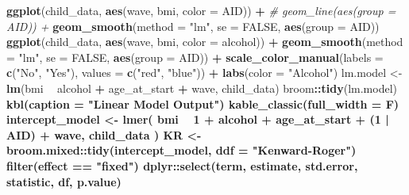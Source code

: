 \documentclass[12pt, twoside]{amherstthesis}
\newenvironment{Shaded}{\begin{snugshade}}{\end{snugshade}}
\newcommand{\CommentTok}[1]{\textcolor[rgb]{0.56,0.35,0.01}{\textit{#1}}}
\newcommand{\DataTypeTok}[1]{\textcolor[rgb]{0.13,0.29,0.53}{#1}}
\newcommand{\DecValTok}[1]{\textcolor[rgb]{0.00,0.00,0.81}{#1}}
\newcommand{\KeywordTok}[1]{\textcolor[rgb]{0.13,0.29,0.53}{\textbf{#1}}}
\newcommand{\NormalTok}[1]{#1}
\newcommand{\OperatorTok}[1]{\textcolor[rgb]{0.81,0.36,0.00}{\textbf{#1}}}
\newcommand{\OtherTok}[1]{\textcolor[rgb]{0.56,0.35,0.01}{#1}}
\newcommand{\StringTok}[1]{\textcolor[rgb]{0.31,0.60,0.02}{#1}}
\begin{document}
\begin{Shaded}
\begin{Highlighting}[]
{{{{{{{{{{{{{{{{{{{{{{{{{{{{{{{{{{{{{{{{{{{{{{{{{{{{{{{{{{{{{{{{{{{{\KeywordTok{ggplot}\NormalTok{(child_data, }\KeywordTok{aes}\NormalTok{(wave, bmi, }\DataTypeTok{color =}\NormalTok{ AID)) }\OperatorTok{+}
\StringTok{  }\CommentTok{# geom_line(aes(group = AID))  +}
\StringTok{  }\KeywordTok{geom_smooth}\NormalTok{(}\DataTypeTok{method =} \StringTok{"lm"}\NormalTok{, }\DataTypeTok{se =} \OtherTok{FALSE}\NormalTok{, }\KeywordTok{aes}\NormalTok{(}\DataTypeTok{group =}\NormalTok{ AID))}
\KeywordTok{ggplot}\NormalTok{(child_data, }\KeywordTok{aes}\NormalTok{(wave, bmi, }\DataTypeTok{color =}\NormalTok{ alcohol)) }\OperatorTok{+}
\StringTok{  }\KeywordTok{geom_smooth}\NormalTok{(}\DataTypeTok{method =} \StringTok{"lm"}\NormalTok{, }\DataTypeTok{se =} \OtherTok{FALSE}\NormalTok{, }\KeywordTok{aes}\NormalTok{(}\DataTypeTok{group =}\NormalTok{ AID)) }\OperatorTok{+}
\StringTok{  }\KeywordTok{scale_color_manual}\NormalTok{(}\DataTypeTok{labels =} \KeywordTok{c}\NormalTok{(}\StringTok{"No"}\NormalTok{, }\StringTok{"Yes"}\NormalTok{), }\DataTypeTok{values =} \KeywordTok{c}\NormalTok{(}\StringTok{"red"}\NormalTok{, }\StringTok{"blue"}\NormalTok{)) }\OperatorTok{+}
\StringTok{  }\KeywordTok{labs}\NormalTok{(}\DataTypeTok{color =} \StringTok{"Alcohol"}\NormalTok{)}
\NormalTok{lm.model <-}\StringTok{ }\KeywordTok{lm}\NormalTok{(bmi }\OperatorTok{~}\StringTok{ }\NormalTok{alcohol }\OperatorTok{+}\StringTok{ }\NormalTok{age_at_start }\OperatorTok{+}\StringTok{ }\NormalTok{wave, child_data)}
\NormalTok{broom}\OperatorTok{::}\KeywordTok{tidy}\NormalTok{(lm.model) }\OperatorTok{%>%}
\StringTok{  }\KeywordTok{kbl}\NormalTok{(}\DataTypeTok{caption =} \StringTok{"Linear Model Output"}\NormalTok{) }\OperatorTok{%>%}
\StringTok{  }\KeywordTok{kable_classic}\NormalTok{(}\DataTypeTok{full_width =}\NormalTok{ F)}
\NormalTok{intercept_model <-}\StringTok{ }\KeywordTok{lmer}\NormalTok{(}
\NormalTok{  bmi }\OperatorTok{~}\StringTok{ }\DecValTok{1} \OperatorTok{+}\StringTok{ }\NormalTok{alcohol }\OperatorTok{+}\StringTok{ }\NormalTok{age_at_start }\OperatorTok{+}\StringTok{ }\NormalTok{(}\DecValTok{1} \OperatorTok{|}\StringTok{ }\NormalTok{AID) }\OperatorTok{+}\StringTok{ }\NormalTok{wave,}
\NormalTok{  child_data}
\NormalTok{)}
\NormalTok{KR <-}\StringTok{ }\NormalTok{broom.mixed}\OperatorTok{::}\KeywordTok{tidy}\NormalTok{(intercept_model, }\DataTypeTok{ddf =} \StringTok{"Kenward-Roger"}\NormalTok{) }\OperatorTok{%>%}
\StringTok{  }\KeywordTok{filter}\NormalTok{(effect }\OperatorTok{==}\StringTok{ "fixed"}\NormalTok{) }\OperatorTok{%>%}
\StringTok{  }\NormalTok{dplyr}\OperatorTok{::}\KeywordTok{select}\NormalTok{(term, estimate, std.error, statistic, df, p.value)}
}}}}}}}}}}}}}}}}}}}}}}}}}}}}}}}}}}}}}}}}}}}}}}}}}}}}}}}}}}}}}}}}}}}}}}}}
\end{Highlighting}
\end{Shaded}
\end{document}
